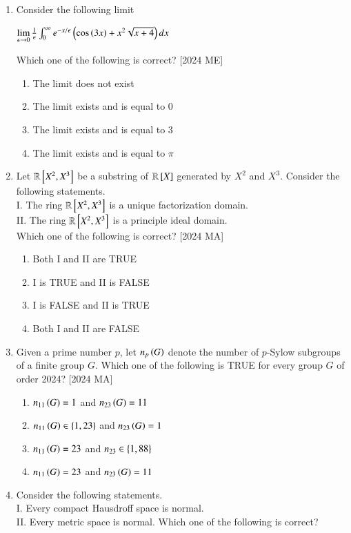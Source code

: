\documentclass[journal]{IEEEtran}
\begin{document}
\begin{enumerate}
    \item Consider the following limit 
    \begin{center}
        $\lim\limits_{\epsilon \to 0} \frac{1}{\epsilon} \int_0^\infty e^{-x / \epsilon}\left(\cos{\ensuremath{\left(3x\right)}} + x^2  \sqrt{x +4}\right)dx$
    \end{center}
    Which one of the following is correct? \hfill [2024 ME]
    \begin{enumerate}
        \item The limit does not exist
        \item The limit exists and is equal to 0
        \item The limit exists and is equal to 3
        \item The limit exists and is equal to $\pi$
    \end{enumerate}
    \item Let $\mathbb{R}{}\left[X^2, X^3\right]$ be a substring of $\mathbb{R} {}\left[X\right]$ generated by $X^2$ and $X^3$. Consider the following
statements.\\
I. The ring $\mathbb{R} {}\left[X^2, X^3\right]$ is a unique factorization domain.\\
II. The ring $\mathbb{R} {}\left[X^2, X^3\right]$ is a principle ideal domain. \\
Which one of the following is correct? \hfill [2024 MA]
\begin{enumerate}
    \item Both I and II are TRUE
    \item I is TRUE and II is FALSE
    \item I is FALSE and II is TRUE
    \item Both I and II are FALSE
\end{enumerate}
\item Given a prime number  $p$, let $n_p\left(G\right)$ denote the number of $p$-Sylow subgroups of a finite group $G$. Which one of the following is TRUE for every group $G$ of order 2024? \hfill [2024 MA]
\begin{enumerate}
    \item $n_{11}\left(G\right) = 1$ and $ n_{23}\left(G\right) = 11$
    \item $n_{11}\left(G\right) \in \left\{1,23\right\}$ and 
    $n_{23}\left(G\right) = 1$
    \item $n_{11}\left(G\right) = 23$ and $n_{23} \in \left\{1,88\right\}$
    \item $n_{11}\left(G\right) = 23$ and $n_{23}\left(G\right) = 11$
\end{enumerate}
\item Consider the following statements.\\
I. Every compact Hausdroff space is normal. \\
II. Every metric space is normal.
Which one of the following is correct?


\end{enumerate}
\end{document}
